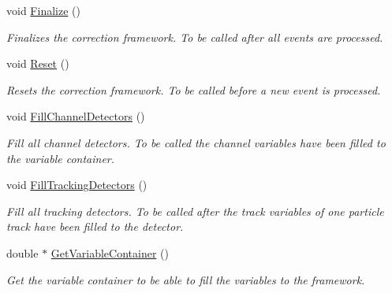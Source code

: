 \begin{DoxyCompactItemize}
void \mbox{\hyperlink{classQn_1_1CorrectionManager_a9e1585bf2d191879219e02d55f65f622}{Finalize}} ()
\begin{DoxyCompactList}\small\item\em Finalizes the correction framework. To be called after all events are processed. \end{DoxyCompactList}\item 
\mbox{\label{classQn_1_1CorrectionManager_a9a13f010c2377943876201ef32bc8406}} 
void \mbox{\hyperlink{classQn_1_1CorrectionManager_a9a13f010c2377943876201ef32bc8406}{Reset}} ()
\begin{DoxyCompactList}\small\item\em Resets the correction framework. To be called before a new event is processed. \end{DoxyCompactList}\item 
\mbox{\label{classQn_1_1CorrectionManager_a6db0318314c251388c4c3d8c8dadd30d}} 
void \mbox{\hyperlink{classQn_1_1CorrectionManager_a6db0318314c251388c4c3d8c8dadd30d}{Fill\+Channel\+Detectors}} ()
\begin{DoxyCompactList}\small\item\em Fill all channel detectors. To be called the channel variables have been filled to the variable container. \end{DoxyCompactList}\item 
\mbox{\label{classQn_1_1CorrectionManager_ad29bc0eec2178d75d13beeb464599141}} 
void \mbox{\hyperlink{classQn_1_1CorrectionManager_ad29bc0eec2178d75d13beeb464599141}{Fill\+Tracking\+Detectors}} ()
\begin{DoxyCompactList}\small\item\em Fill all tracking detectors. To be called after the track variables of one particle track have been filled to the detector. \end{DoxyCompactList}\item 
double $\ast$ \mbox{\hyperlink{classQn_1_1CorrectionManager_a2883b579d2c4afbccee27add9101e84a}{Get\+Variable\+Container}} ()
\begin{DoxyCompactList}\small\item\em Get the variable container to be able to fill the variables to the framework. \end{DoxyCompactList}\item 

\end{DoxyCompactItemize}
